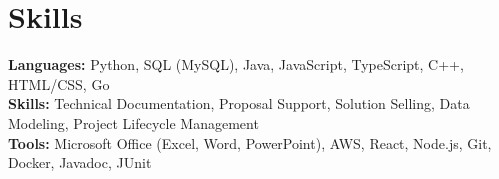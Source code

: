 \documentclass[11pt]{article}       %
\begin{document}

\vspace{-18.5pt}

\section*{Skills}
\textbf{Languages:} Python, SQL (MySQL), Java, JavaScript, TypeScript, C++, HTML/CSS, Go\\
\textbf{Skills:} Technical Documentation, Proposal Support, Solution Selling, Data Modeling, Project Lifecycle Management\\
\textbf{Tools:} Microsoft Office (Excel, Word, PowerPoint), AWS, React, Node.js, Git, Docker, Javadoc, JUnit\\

\vspace{-6.5pt}
\end{document}
